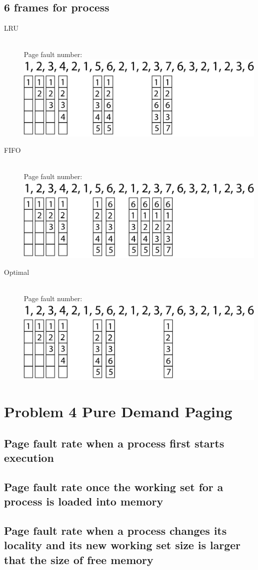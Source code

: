 \documentclass{article}
\begin{document}
\subsection{6 frames for process}
\begin{description}
    \item[LRU] \hfill \\ 
    Page fault number:\\ 
    \includegraphics[width=1\linewidth]{./LRU5.png}
    \item[FIFO] \hfill \\
    Page fault number:\\ 
    \includegraphics[width=1\linewidth]{./FIFO5.png}
    \item[Optimal] \hfill \\
    Page fault number:\\ 
    \includegraphics[width=1\linewidth]{./Optimal5.png}
\end{description}

\newpage
\section{Problem 4 Pure Demand Paging}
\subsection{Page fault rate when a process first starts execution}
\subsection{Page fault rate once the working set for a process is loaded into memory}
\subsection{Page fault rate when a process changes its locality and its new working set size is larger that the size of free memory}
\end{document}
